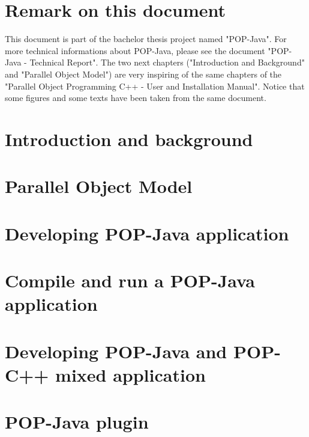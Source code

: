\documentclass[a4paper, 11pt]{article}
\newcommand{\emptypage}{\newpage \thispagestyle{empty} \mbox{}\newpage}
\begin{document}


\tableofcontents
\pagebreak

\section{Remark on this document}
This document is part of the bachelor thesis project named "POP-Java". For more technical informations about POP-Java, please see the document "POP-Java - Technical Report"\cite{popjava_tech}. The two next chapters ("Introduction and Background" and "Parallel Object Model") are very inspiring of the same chapters of the "Parallel Object Programming C++ - User and Installation Manual"\cite{popc_intro}. Notice that some figures and some texts have been taken from the same document.

\pagebreak
\section{Introduction and background}


\pagebreak
\section{Parallel Object Model}


\pagebreak
\section{Developing POP-Java application}


\pagebreak
\section{Compile and run a POP-Java application}


\pagebreak
\section{Developing POP-Java and POP-C++ mixed application}


\pagebreak
\section{POP-Java plugin}

\end{document}
